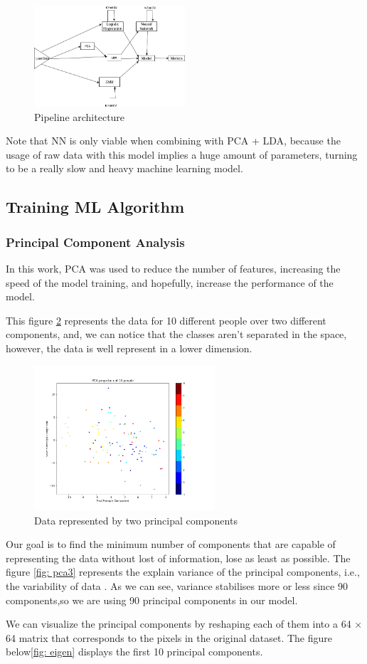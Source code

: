 \documentclass[12pt,a4paper,twocolumn]{article}
\begin{document}
\begin{figure}[H]
\hspace*{-0.5cm}
\includegraphics[width=0.5\textwidth]{images2/arch.png}
\caption{\label{fig: arch} Pipeline architecture}
\end{figure}
Note that NN is only viable when combining with PCA + LDA, because the usage of raw data with this model implies a huge amount of parameters, turning to be a really slow and heavy machine learning model.
\subsection{Training ML Algorithm}
\subsubsection{Principal Component Analysis}
\par In this work, PCA was used to reduce the number of features, increasing the speed  of the model training, and hopefully, increase the performance of the model.
\par This figure \ref{fig: pca2} represents the data for 10 different people over two different components, and, we can notice that the classes aren't separated in the space, however, the data is well represent in a lower dimension.
\begin{figure}[H]
\centering
\includegraphics[width=0.6\textwidth]{images2/pca2.png}
\caption{\label{fig: pca2} Data represented by two principal components}
\end{figure}
Our goal is to find the minimum number of components that are capable of representing the data without lost of information, lose as least as possible. The figure \ref{fig: pca3} represents the explain variance of the principal components, i.e., the variability of data . As we can see, variance stabilises more or less since 90 components,so we are using 90 principal components in our model. 
\par  We can visualize the principal components by reshaping each of them into a 64 × 64 matrix that corresponds to the pixels in the original dataset. 
The figure below\ref{fig: eigen} displays the ﬁrst 10 principal components.
\end{document}
